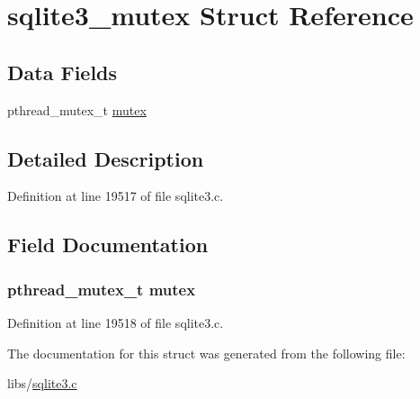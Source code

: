 \hypertarget{structsqlite3__mutex}{}\section{sqlite3\+\_\+mutex Struct Reference}
\label{structsqlite3__mutex}
\subsection*{Data Fields}
\begin{DoxyCompactItemize}
\item 
pthread\+\_\+mutex\+\_\+t \hyperlink{structsqlite3__mutex_a4acff8232e4aec9cd5c6dc200ac55ef3}{mutex}
\end{DoxyCompactItemize}


\subsection{Detailed Description}


Definition at line 19517 of file sqlite3.\+c.



\subsection{Field Documentation}
\hypertarget{structsqlite3__mutex_a4acff8232e4aec9cd5c6dc200ac55ef3}{}
\subsubsection[{mutex}]{\setlength{\rightskip}{0pt plus 5cm}pthread\+\_\+mutex\+\_\+t mutex}\label{structsqlite3__mutex_a4acff8232e4aec9cd5c6dc200ac55ef3}


Definition at line 19518 of file sqlite3.\+c.



The documentation for this struct was generated from the following file\+:\begin{DoxyCompactItemize}
\item 
libs/\hyperlink{sqlite3_8c}{sqlite3.\+c}\end{DoxyCompactItemize}
